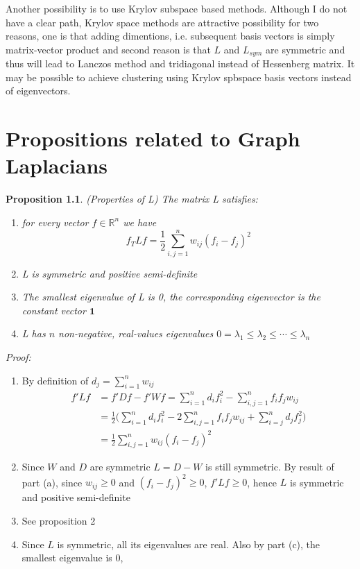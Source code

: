 \documentclass[10pt,a4paper, nocenter]{report}
\newtheorem{prop}{Proposition}
\begin{document}
    Another possibility is to use Krylov subspace based methods. Although I do not have a clear path, Krylov space methods are attractive possibility for two reasons, one is that adding dimentions, i.e. subsequent basis vectors is simply matrix-vector product and second reason is that $L$ and $L_{sym}$ are symmetric and thus will lead to Lanczos method and tridiagonal instead of Hessenberg matrix. It may be possible to achieve clustering using Krylov spbspace basis vectors instead of eigenvectors. 


    \appendix
    \chapter{Propositions related to Graph Laplacians}
    \begin{prop}(Properties of L) The matrix L satisfies:
        \begin{enumerate}
            \item for every vector $f \in \mathbb{R}^{n}$ we have $$ f_{T}Lf = \frac{1}{2}\sum_{i,j=1}^{n} w_{ij}(f_{i}-f_{j})^{2} $$
            \item L is symmetric and positive semi-definite
            \item The smallest eigenvalue of L is 0, the corresponding eigenvector is the constant vector $\mathbf{1}$
            \item L has $n$ non-negative, real-values eigenvalues $0=\lambda_{1} \le \lambda_{2} \le \cdots \le \lambda_{n}$
        \end{enumerate}
    \end{prop}
    \textit{Proof:}
    \begin{enumerate}
        \item  By definition of $d_{j} = \sum_{i=1}^{n}w_{ij}$
        \begin{align*}
        f'Lf & = f'Df - f'Wf = \sum_{i=1}^{n}d_{i}f_{i}^{2} -  \sum_{i,j=1}^{n}f_{i}f_{j}w_{ij}\\
        & = \frac{1}{2}\bigg(\sum_{i=1}^{n}d_{i}f_{i}^{2} -  2\sum_{i,j=1}^{n}f_{i}f_{j}w_{ij} + \sum_{i=j}^{n}d_{j}f_{j}^{2}\bigg)\\
        & = \frac{1}{2}\sum_{i,j=1}^{n}w_{ij}(f_{i}-f_{j})^{2}
        \end{align*}
        \item Since $W$ and $D$ are symmetric $L = D-W$ is still symmetric. By result of part (a), since $w_{ij} \ge 0$ and $(f_{i}-f_{j})^{2} \ge 0$, $f'Lf \ge 0$, hence $L$ is symmetric and positive semi-definite
        \item See proposition 2
        \item Since $L$ is symmetric, all its eigenvalues are real. Also by part (c), the smallest eigenvalue is 0, 
    \end{enumerate}
\end{document}

